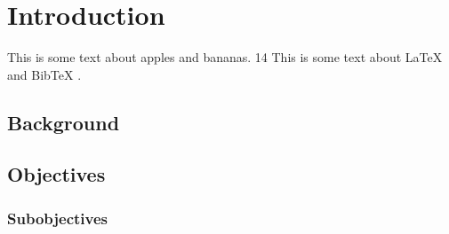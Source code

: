 
\chapter{Introduction}

This is some text about apples and bananas.
 14 This is some text about LaTeX \cite{latex_guide} and BibTeX \cite{bibtex_gui    de}.

\lipsum[1-3]

\section{Background}

\lipsum[4-6]

\section{Objectives}

\lipsum[7-9]

\subsection{Subobjectives}

\lipsum[10-12]
